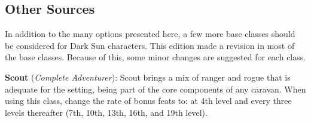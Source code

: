 
\subsection{Other Sources}
In addition to the many options presented here, a few more base classes should be considered for {\tableheader Dark Sun} characters. This edition made a revision in most of the base classes. Because of this, some minor changes are suggested for each class.

\textbf{Scout} (\emph{Complete Adventurer}): Scout brings a mix of ranger and rogue that is adequate for the setting, being part of the core components of any caravan. When using this class, change the rate of bonus feats to: at 4th level and every three levels thereafter (7th, 10th, 13th, 16th, and 19th level).



\clearpage







% 



% 

\clearpage



